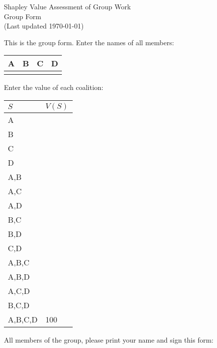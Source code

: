\documentclass[12pt]{article}
\begin{document}
\begin{center}
\Large{Shapley Value Assessment of Group Work}\\
Group Form\\
\tiny{(Last updated \today)}
\end{center}

This is the group form. Enter the names of all members:
\vspace{1cm}

\begin{center}
\begin{tabular}{p{3cm}|p{3cm}|p{3cm}|p{3cm}}
A&B&C&D\\
\hline
&&&
\end{tabular}
\end{center}
\vspace{1cm}

Enter the value of each coalition:
\vspace{.5cm}

\begin{center}
\begin{tabular}{l|p{2cm}}
$S$&$V(S)$\\\hline
A&\\\hline
B&\\\hline
C&\\\hline
D&\\\hline
A,B&\\\hline
A,C&\\\hline
A,D&\\\hline
B,C&\\\hline
B,D&\\\hline
C,D&\\\hline
A,B,C&\\\hline
A,B,D&\\\hline
A,C,D&\\\hline
B,C,D&\\\hline
A,B,C,D&100\\\hline
\end{tabular}
\end{center}

\vspace{.5cm}

All members of the group, please print your name and sign this form:
\end{document}
